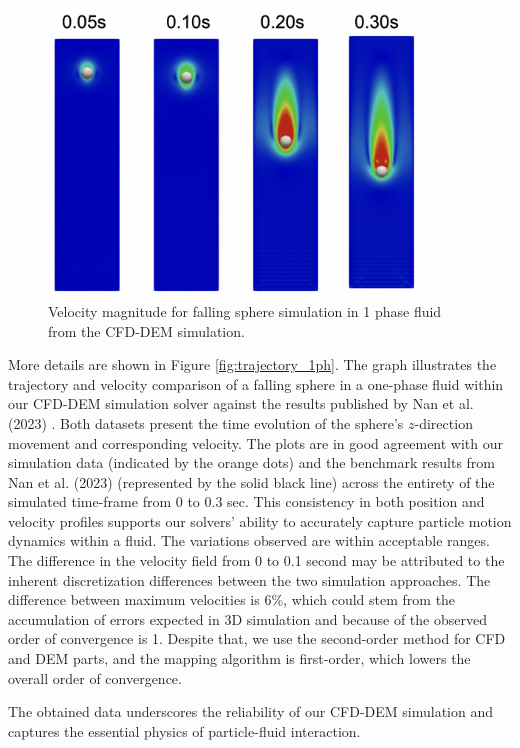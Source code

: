 \begin{figure}[!ht]
    \centering
    \includegraphics[width=10cm]{Images/chap3/1ph_exp_me.png}
    \caption{Velocity magnitude for falling sphere simulation in 1 phase fluid from the CFD-DEM simulation.}
    \label{fig:1ph_exp_me}
\end{figure}

More details are shown in Figure \ref{fig:trajectory_1ph}. The graph illustrates the trajectory and velocity comparison of a falling sphere in a one-phase fluid within our CFD-DEM simulation solver against the results published by Nan et al. (2023) \cite{nan2023high}. Both datasets present the time evolution of the sphere's $z$-direction movement and corresponding velocity. The plots are in good agreement with our simulation data (indicated by the orange dots) and the benchmark results from Nan et al. (2023)\cite{nan2023high} (represented by the solid black line) across the entirety of the simulated time-frame from 0 to 0.3 sec. This consistency in both position and velocity profiles supports our solvers' ability to accurately capture particle motion dynamics within a fluid. The variations observed are within acceptable ranges. The difference in the velocity field from 0 to 0.1 second may be attributed to the inherent discretization differences between the two simulation approaches. The difference between maximum velocities is $6$\%, which could stem from the accumulation of errors expected in 3D simulation and because of the observed order of convergence is 1. Despite that, we use the second-order method for CFD and DEM parts, and the mapping algorithm is first-order, which lowers the overall order of convergence.

The obtained data underscores the reliability of our CFD-DEM simulation and captures the essential physics of particle-fluid interaction.

